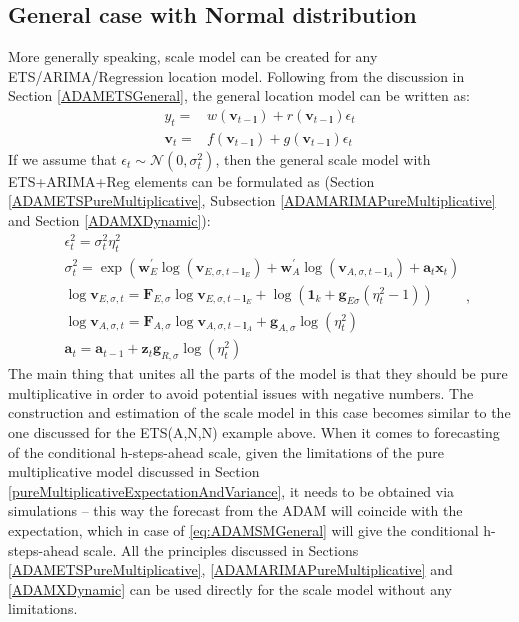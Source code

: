 \documentclass[
]{book}
\theoremstyle{definition}
\theoremstyle{definition}
\theoremstyle{definition}
\theoremstyle{definition}
\theoremstyle{remark}
\begin{document}
\hypertarget{general-case-with-normal-distribution}{%
\subsection{General case with Normal distribution}\label{general-case-with-normal-distribution}}

More generally speaking, scale model can be created for any ETS/ARIMA/Regression location model. Following from the discussion in Section \ref{ADAMETSGeneral}, the general location model can be written as:
\begin{equation*}
  \begin{aligned}
    {y}_{t} = & w(\mathbf{v}_{t-\mathbf{l}}) + r(\mathbf{v}_{t-\mathbf{l}}) \epsilon_t \\
    \mathbf{v}_{t} = & f(\mathbf{v}_{t-\mathbf{l}}) + g(\mathbf{v}_{t-\mathbf{l}}) \epsilon_t
  \end{aligned}
\end{equation*}
If we assume that \(\epsilon_t \sim \mathcal{N}(0,\sigma^2_t)\), then the general scale model with ETS+ARIMA+Reg elements can be formulated as (Section \ref{ADAMETSPureMultiplicative}, Subsection \ref{ADAMARIMAPureMultiplicative} and Section \ref{ADAMXDynamic}):
\begin{equation}
  \begin{aligned}
        & \epsilon_t^2 = \sigma_t^2 \eta_{t}^2 \\
        & \sigma_t^2 = \exp \left(\mathbf{w}_E^\prime \log(\mathbf{v}_{E,\sigma,t-\mathbf{l}_E}) + \mathbf{w}_A^\prime \log(\mathbf{v}_{A,\sigma,t-\mathbf{l}_A}) + \mathbf{a}_t \mathbf{x}_t \right)\\
        & \log \mathbf{v}_{E,\sigma,t} = \mathbf{F}_{E,\sigma} \log \mathbf{v}_{E,\sigma,t-\mathbf{l}_E} + \log(\mathbf{1}_k + \mathbf{g}_{E\sigma} (\eta_t^2-1))\\
    & \log \mathbf{v}_{A,\sigma,t} = \mathbf{F}_{A,\sigma} \log \mathbf{v}_{A,\sigma,t-\mathbf{l}_A} + \mathbf{g}_{A,\sigma} \log(\eta_t^2) \\
    & \mathbf{a}_{t} = \mathbf{a}_{t-1} + \mathbf{z}_t \mathbf{g}_{R,\sigma} \log(\eta_t^2)
  \end{aligned},
  \label{eq:ADAMSMGeneral}
\end{equation}
The main thing that unites all the parts of the model is that they should be pure multiplicative in order to avoid potential issues with negative numbers. The construction and estimation of the scale model in this case becomes similar to the one discussed for the ETS(A,N,N) example above. When it comes to forecasting of the conditional h-steps-ahead scale, given the limitations of the pure multiplicative model discussed in Section \ref{pureMultiplicativeExpectationAndVariance}, it needs to be obtained via simulations -- this way the forecast from the ADAM will coincide with the expectation, which in case of \eqref{eq:ADAMSMGeneral} will give the conditional h-steps-ahead scale. All the principles discussed in Sections \ref{ADAMETSPureMultiplicative}, \ref{ADAMARIMAPureMultiplicative} and \ref{ADAMXDynamic} can be used directly for the scale model without any limitations.
\end{document}

